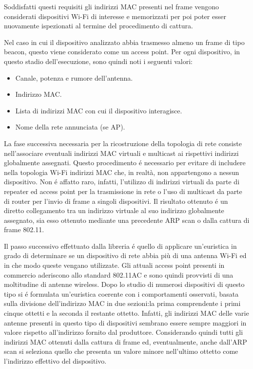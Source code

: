 Soddisfatti questi requisiti gli indirizzi MAC presenti nel frame vengono considerati dispositivi Wi-Fi di interesse e memorizzati per poi poter esser nuovamente ispezionati al termine del procedimento di cattura.

Nel caso in cui il dispositivo analizzato abbia trasmesso almeno un frame di tipo beacon, questo viene considerato come un access point.
\newpage
Per ogni dispositivo, in questo stadio dell'esecuzione, sono quindi noti i seguenti valori:
\begin{itemize}
	\item Canale, potenza e rumore dell'antenna.
	\item Indirizzo MAC.
	\item Lista di indirizzi MAC con cui il dispositivo interagisce.
	\item Nome della rete annunciata (se AP).
\end{itemize}

La fase successiva necessaria per la ricostruzione della topologia di rete consiste nell'associare eventuali indirizzi MAC virtuali e multicast ai rispettivi indirizzi globalmente assegnati.
Questo procedimento \'e necessario per evitare di includere nella topologia Wi-Fi indirizzi MAC che, in realt\`a, non appartengono a nessun dispositivo.
Non \'e affatto raro, infatti, l'utilizzo di indirizzi virtuali da parte di repeater ed access point per la trasmissione in rete o l'uso di multicast da parte di router per l'invio di frame a singoli dispositivi.
Il risultato ottenuto \'e un diretto collegamento tra un indirizzo virtuale al suo indirizzo globalmente assegnato, sia esso ottenuto mediante una precedente ARP scan o dalla cattura di frame 802.11.

Il passo successivo effettuato dalla libreria \'e quello di applicare un'euristica in grado di determinare se un dispositivo di rete abbia pi\`u di una antenna Wi-Fi ed in che modo queste vengano utilizzate.
Gli attuali access point presenti in commercio aderiscono allo standard 802.11AC e sono quindi provvisti di una moltitudine di antenne wireless.
Dopo lo studio di numerosi dispositivi di questo tipo si \'e formulata un'euristica coerente con i comportamenti osservati, basata sulla divisione dell'indirizzo MAC in due sezioni:la prima comprendente i primi cinque ottetti e la seconda il restante ottetto.
Infatti, gli indirizzi MAC delle varie antenne presenti in questo tipo di dispositivi sembrano essere sempre maggiori in valore rispetto all'indirizzo fornito dal produttore.
Considerando quindi tutti gli indirizzi MAC ottenuti dalla cattura di frame ed, eventualmente, anche dall'ARP scan si seleziona quello che presenta un valore minore nell'ultimo ottetto come l'indirizzo effettivo del dispositivo.

